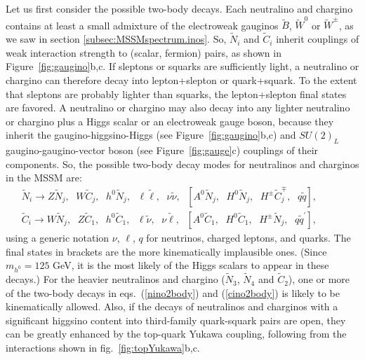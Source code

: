 \documentclass[12pt]{article}
\def\beq{\begin{eqnarray}}
\def\eeq{\end{eqnarray}}
\def\stilde{\widetilde}
\begin{document}
Let us first consider the possible two-body decays. Each neutralino and
chargino contains at least a small admixture of the electroweak gauginos
$\stilde B$, $\stilde W^0$ or $\stilde W^\pm$, as we saw in section
\ref{subsec:MSSMspectrum.inos}. So, $\stilde N_i$ and $\stilde C_i$ inherit
couplings of weak interaction strength to (scalar, fermion) pairs, as
shown in Figure~\ref{fig:gaugino}b,c. If sleptons or squarks are
sufficiently light, a neutralino or chargino can therefore decay into
lepton+slepton or quark+squark.  To the extent that sleptons are probably
lighter than squarks, the lepton+slepton final states are favored. A
neutralino or chargino may also decay into any lighter neutralino or
chargino plus a Higgs scalar or an electroweak gauge boson, because they
inherit the gaugino-higgsino-Higgs (see Figure~\ref{fig:gaugino}b,c) and
$SU(2)_L$ gaugino-gaugino-vector boson (see Figure~\ref{fig:gauge}c)
couplings of their components. So, the possible two-body decay modes for
neutralinos and charginos in the MSSM are: 
\beq
\stilde N_i \rightarrow
Z\stilde N_j,\>\>\, W\stilde C_j,\>\>\, h^0\stilde N_j,\>\>\, \ell \stilde
\ell,\>\>\,
\nu \stilde \nu,\>\>\,
[A^0 \stilde N_j,\>\>\, H^0 \stilde N_j,\>\>\, H^\pm
\stilde C_j^\mp,\>\>\,
q\stilde q],
\qquad\>\>\>{}
\label{nino2body}
\\
\stilde C_i \rightarrow
W\stilde N_j,\>\>\, Z\stilde C_1,\>\>\, h^0\stilde C_1,\>\>\, \ell \stilde
\nu,\>\>\,
\nu \stilde \ell,\>\>\,
[A^0 \stilde C_1,\>\>\, H^0 \stilde C_1,\>\>\, H^\pm \stilde N_j,\>\>\,
q\stilde q^\prime],
\qquad\>\>\>{}
\label{cino2body}
\eeq
using a generic notation $\nu$, $\ell$, $q$ for neutrinos, charged
leptons, and quarks. The final states in brackets are the more
kinematically implausible ones. (Since $m_{h^0} = 125$ GeV, it
is the most likely of the Higgs scalars to appear in these decays.) For
the heavier neutralinos and chargino ($\stilde N_3$, $\stilde N_4$ and
$\stilde C_2$), one or more of the two-body decays in
eqs.~(\ref{nino2body}) and (\ref{cino2body}) is likely to be kinematically
allowed. Also, if the decays of neutralinos and charginos with a
significant higgsino content into third-family quark-squark pairs are
open, they can be greatly enhanced by the top-quark Yukawa coupling,
following from the interactions shown in fig.~\ref{fig:topYukawa}b,c. 
\end{document}
